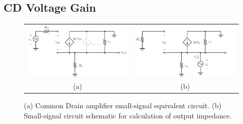 \subsection{CD Voltage Gain}
\begin{figure}[tb]
\begin{center}
\begin{tabular}{cc}
\includegraphics[scale=.75]{cd_amp_ss_av2} &
\includegraphics[scale=.75]{cd_amp_ss_rout} \\
(a) & (b) \\
\end{tabular}
\end{center}
\caption{(a) Common Drain amplifier small-signal equivalent circuit.  (b)  Small-signal circuit schematic for calculation of output impedance.}
\label{fig:cd_amp_ss_av2}
\end{figure}

